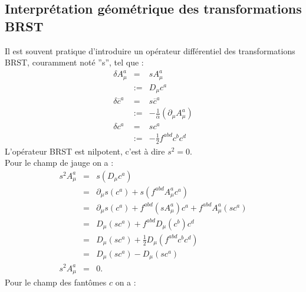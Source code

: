 \documentclass[a4paper,11pt]{article}
\theoremstyle{plain}
\theoremstyle{definition}
\theoremstyle{remark}
\numberwithin{equation}{section}
\numberwithin{equation}{subsection}
\numberwithin{figure}{section}
\begin{document}
\subsection{Interprétation géométrique des transformations BRST}

\noindent
Il est souvent pratique d'introduire un opérateur différentiel des transformations BRST, couramment noté ''s'', tel que :
\begin{eqnarray}
 \delta A^{a}_{\mu}  &=& s A^{a}_{\mu}  \\
                                   &:=&  D_{\mu} c^{a} \\
 \delta \overline{c}^{a}  &=& s  \overline{c}^{a} \\
                                         &:=& - \frac{1}{\alpha} \left( \partial_{\mu} A^{a}_{\mu} \right) \\
 \delta c^{a} &=& s c^{a} \\
                      &:=& - \frac{1}{2} f^{abd} c^{b} c^{d}
\end{eqnarray}
L'opérateur BRST est nilpotent, c'est à dire $s^2 =0$. \\
Pour le champ de jauge on a :
\begin{eqnarray}
 s^2 A^{a}_{\mu}  &=& s \left( D_{\mu} c^{a} \right) \\
                               &=& \partial_{\mu} s \left( c^{a} \right) + s \left( f^{abd} A^{a}_{\mu} c^{a} \right)  \\
                               &=& \partial_{\mu} s \left( c^{a} \right) +  f^{abd} \left( s A^{a}_{\mu} \right) c^{a} +  f^{abd}  A^{a}_{\mu} 
\left( s c^{a} \right)  \\
                               &=& D_{\mu} (s c^{a} ) +  f^{abd} D_{\mu} (c^{b} ) c^{d} \\
                               &=& D_{\mu} (s c^{a} ) +  \frac{1}{2} D_{\mu}  ( f^{abd} c^{b} c^{d} ) \\
                               &=& D_{\mu} (s c^{a} )  -  D_{\mu}  ( s c^{a} ) \\
 s^2 A^{a}_{\mu} &=& 0.
\end{eqnarray}
Pour le champ des fantômes $c$ on a :
\end{document}
